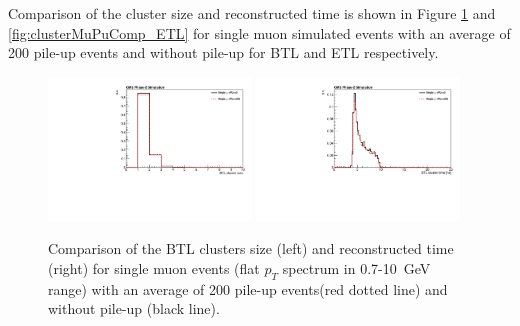 Comparison of the cluster size and reconstructed time 
is shown in Figure \ref{fig:clusterMuPuComp_BTL} and \ref{fig:clusterMuPuComp_ETL} for single muon simulated events with an average of 200 pile-up events and without pile-up for BTL and ETL respectively.

\begin{figure}[!h]
\centering
\includegraphics[width=0.48\textwidth]{fig/performance/ClusterAndTracks/BTLbestCluster_size_muPUcomp.pdf}
\includegraphics[width=0.48\textwidth]{fig/performance/ClusterAndTracks/BTLbestCluster_time_muPUcomp.pdf}
\caption{Comparison of the BTL clusters size (left) and reconstructed time (right)
for single muon events (flat $p_{T}$ spectrum in 0.7-10~GeV range) with an average of 200 pile-up events(red dotted line) and without pile-up (black line).}
\label{fig:clusterMuPuComp_BTL}
\end{figure}

